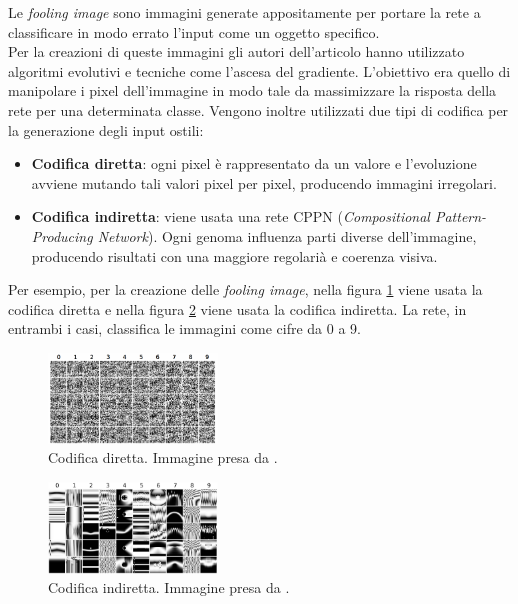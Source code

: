 Le \emph{fooling image} sono immagini generate appositamente per portare la rete a classificare in modo errato l'input come un oggetto specifico.\\
Per la creazioni di queste immagini gli autori dell'articolo hanno utilizzato algoritmi evolutivi e tecniche come l'ascesa del gradiente. L'obiettivo era quello di manipolare i pixel dell'immagine in modo tale da massimizzare la risposta della rete per una determinata classe. Vengono inoltre utilizzati due tipi di codifica per la generazione degli input ostili: 
\begin{itemize}
    \item \textbf{Codifica diretta}: ogni pixel \`e rappresentato da un valore e l'evoluzione avviene mutando tali valori pixel per pixel, producendo immagini irregolari.
    \item \textbf{Codifica indiretta}: viene usata una rete CPPN (\emph{Compositional Pattern-Producing Network}). Ogni genoma influenza parti diverse dell'immagine, producendo risultati con una maggiore regolari\`a e coerenza visiva.
\end{itemize}
Per esempio, per la creazione delle \emph{fooling image}, nella figura \ref{fig:direct_encoding_example} viene usata la codifica diretta e nella figura \ref{fig:indirect_encoding_example} viene usata la codifica indiretta. La rete, in entrambi i casi, classifica le immagini come cifre da 0 a 9.

\begin{figure}[H]
    \centering
    \includegraphics[width=0.4\textwidth]{media/2-fooling/deep_neural_networks_are_easily_fooled_direct_encoding_example.png}
    \caption{Codifica diretta. Immagine presa da \cite{blackbox_fool15}.}
    \label{fig:direct_encoding_example}
\end{figure}
\begin{figure}[H]
    \centering
    \includegraphics[width=0.4\textwidth]{media/2-fooling/deep_neural_networks_are_easily_fooled_indirect_encoding_example.png}
    \caption{Codifica indiretta. Immagine presa da \cite{blackbox_fool15}.}
    \label{fig:indirect_encoding_example}
\end{figure}

